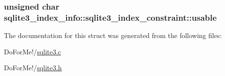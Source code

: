 \hypertarget{structsqlite3__index__info_1_1sqlite3__index__constraint_ae16e62caeab743cc68bb22227dacb501}{
\subsubsection[{usable}]{\setlength{\rightskip}{0pt plus 5cm}unsigned char sqlite3\-\_\-index\-\_\-info\-::sqlite3\-\_\-index\-\_\-constraint\-::usable}}\label{structsqlite3__index__info_1_1sqlite3__index__constraint_ae16e62caeab743cc68bb22227dacb501}


The documentation for this struct was generated from the following files\-:\begin{DoxyCompactItemize}
\item 
Do\-For\-Me!/\hyperlink{sqlite3_8c}{sqlite3.\-c}\item 
Do\-For\-Me!/\hyperlink{sqlite3_8h}{sqlite3.\-h}\end{DoxyCompactItemize}
